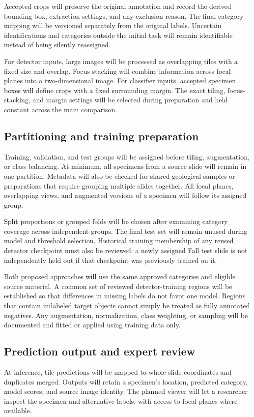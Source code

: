 \documentclass[11pt,letterpaper]{article}
\begin{document}
Accepted crops will preserve the original annotation and record the derived bounding box, extraction settings, and any exclusion reason. The final category mapping will be versioned separately from the original labels. Uncertain identifications and categories outside the initial task will remain identifiable instead of being silently reassigned.

For detector inputs, large images will be processed as overlapping tiles with a fixed size and overlap. Focus stacking will combine information across focal planes into a two-dimensional image. For classifier inputs, accepted specimen boxes will define crops with a fixed surrounding margin. The exact tiling, focus-stacking, and margin settings will be selected during preparation and held constant across the main comparison.

\subsection{Partitioning and training preparation}
Training, validation, and test groups will be assigned before tiling, augmentation, or class balancing. At minimum, all specimens from a source slide will remain in one partition. Metadata will also be checked for shared geological samples or preparations that require grouping multiple slides together. All focal planes, overlapping views, and augmented versions of a specimen will follow its assigned group.

Split proportions or grouped folds will be chosen after examining category coverage across independent groups. The final test set will remain unused during model and threshold selection. Historical training membership of any reused detector checkpoint must also be reviewed: a newly assigned Fall test slide is not independently held out if that checkpoint was previously trained on it.

Both proposed approaches will use the same approved categories and eligible source material. A common set of reviewed detector-training regions will be established so that differences in missing labels do not favor one model. Regions that contain unlabeled target objects cannot simply be treated as fully annotated negatives. Any augmentation, normalization, class weighting, or sampling will be documented and fitted or applied using training data only.

\subsection{Prediction output and expert review}
At inference, tile predictions will be mapped to whole-slide coordinates and duplicates merged. Outputs will retain a specimen's location, predicted category, model scores, and source image identity. The planned viewer will let a researcher inspect the specimen and alternative labels, with access to focal planes where available.
\end{document}
